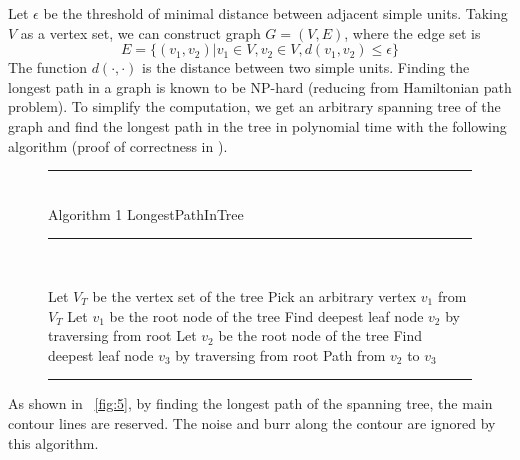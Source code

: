 \documentclass[10pt,letterpaper]{article}
\newenvironment{myalgorithm}[1]%
{\begin{figure}[!h]\small\noindent\rule{\linewidth}{1pt}\\#1\vspace{-0.5em}\\%
\rule{\linewidth}{0.5pt}\\\vspace{-1em}}%
{\vspace{-0.5em}\rule{\linewidth}{1pt}\end{figure}}
\begin{document}
Let $\epsilon$ be the threshold of minimal distance between adjacent simple units.
Taking $V$ as a vertex set, we can construct graph $G=(V,E)$, where the edge set is
\begin{equation}\label{equ:3}
E=\{(v_1,v_2)|v_1\in V,v_2\in V,d(v_1,v_2)\le\epsilon\}
\end{equation}
The function $d(\cdot,\cdot)$ is the distance between two simple units.
Finding the longest path in a graph is known to be NP-hard (reducing from Hamiltonian path problem).
To simplify the computation, we get an arbitrary spanning tree of the graph
and find the longest path in the tree in polynomial time with the following algorithm
(proof of correctness in \cite{bulterman2002}).

\begin{myalgorithm}{Algorithm 1 LongestPathInTree}
\begin{algorithmic}[1]
\STATE Let $V_T$ be the vertex set of the tree
\STATE Pick an arbitrary vertex $v_1$ from $V_T$
\STATE Let $v_1$ be the root node of the tree
\STATE Find deepest leaf node $v_2$ by traversing from root
\STATE Let $v_2$ be the root node of the tree
\STATE Find deepest leaf node $v_3$ by traversing from root
\RETURN Path from $v_2$ to $v_3$
\end{algorithmic}
\end{myalgorithm}

As shown in \figurename~\ref{fig:5},
by finding the longest path of the spanning tree,
the main contour lines are reserved.
The noise and burr along the contour are ignored by this algorithm.
\end{document}
